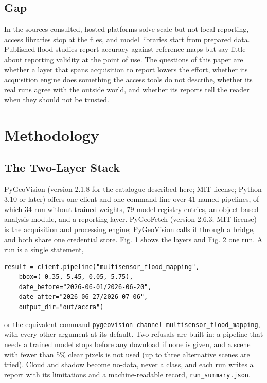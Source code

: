 \documentclass[conference]{IEEEtran}
\begin{document}
\subsection{Gap}

In the sources consulted, hosted platforms solve scale but not local reporting, access libraries stop at the files, and model libraries start from prepared data. Published flood studies report accuracy against reference maps but say little about reporting validity at the point of use. The questions of this paper are whether a layer that spans acquisition to report lowers the effort, whether its acquisition engine does something the access tools do not describe, whether its real runs agree with the outside world, and whether its reports tell the reader when they should not be trusted.

\section{Methodology}

\subsection{The Two-Layer Stack}

PyGeoVision (version 2.1.8 for the catalogue described here; MIT license; Python 3.10 or later) offers one client and one command line over 41 named pipelines, of which 34 run without trained weights, 79 model-registry entries, an object-based analysis module, and a reporting layer. PyGeoFetch (version 2.6.3; MIT license) is the acquisition and processing engine; PyGeoVision calls it through a bridge, and both share one credential store. Fig. 1 shows the layers and Fig. 2 one run. A run is a single statement,

\begin{scriptsize}
\begin{verbatim}
result = client.pipeline("multisensor_flood_mapping",
    bbox=(-0.35, 5.45, 0.05, 5.75),
    date_before="2026-06-01/2026-06-20",
    date_after="2026-06-27/2026-07-06",
    output_dir="out/accra")
\end{verbatim}
\end{scriptsize}

or the equivalent command \texttt{pygeovision channel multisensor\_\allowbreak{}flood\_\allowbreak{}mapping}, with every other argument at its default. Two refusals are built in: a pipeline that needs a trained model stops before any download if none is given, and a scene with fewer than 5\% clear pixels is not used (up to three alternative scenes are tried). Cloud and shadow become no-data, never a class, and each run writes a report with its limitations and a machine-readable record, \texttt{run\_\allowbreak{}summary.json}.
\end{document}
